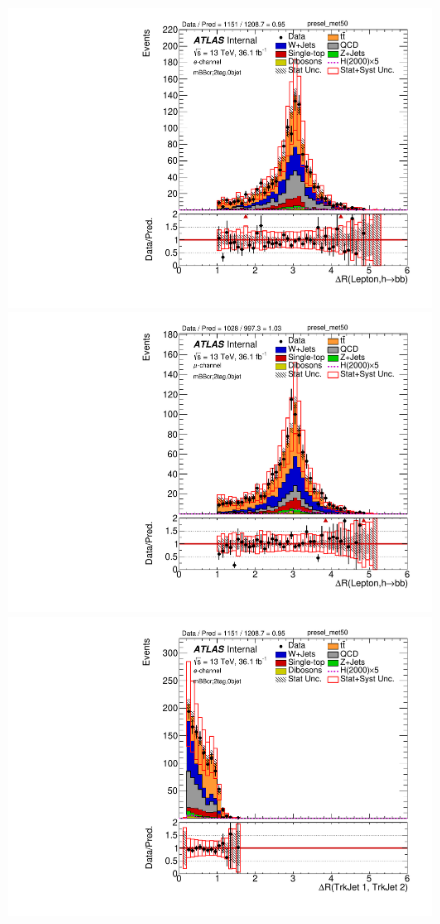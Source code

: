 \begin{figure}[!h]
\begin{center}
\includegraphics[scale=0.33]{./figures/boosted/PlotByChannels/DataMC_2tag_0bjet_mbbcr_elec_presel_met50_drHbbLep}                                                                                   
\includegraphics[scale=0.33]{./figures/boosted/PlotByChannels/DataMC_2tag_0bjet_mbbcr_muon_presel_met50_drHbbLep}                                                                                   
\includegraphics[scale=0.33]{./figures/boosted/PlotByChannels/DataMC_2tag_0bjet_mbbcr_elec_presel_met50_drbtrkjet1btrkjet2}                                                                         

\end{center}
\end{figure}
